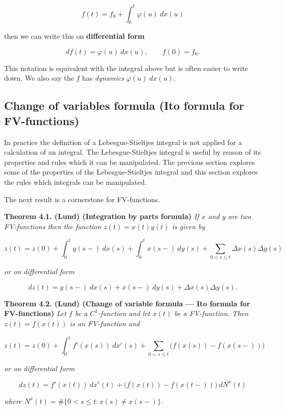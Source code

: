\documentclass[a4paper,12pt,openany]{book}
\begin{document}
\[
f(t)=f_0+\int_0^t\varphi(u)\ dx(u)
\]

then we can write this on \textbf{differential form}

\[
df(t)=\varphi(u)\ dx(u),\qquad f(0)=f_0.
\]

This notation is equivalent with the integral above but is often easier to write down. We also say the \(f\) has \emph{dynamics} \(\varphi(u)\ dx(u)\).

\hypertarget{change-of-variables-formula-ito-formula-for-fv-functions}{%
\subsection{Change of variables formula (Ito formula for FV-functions)}\label{change-of-variables-formula-ito-formula-for-fv-functions}}

In practice the definition of a Lebesgue-Stieltjes integral is not applied for a calculation of an integral. The Lebesgue-Stieltjes integral is useful by reason of its properties and rules which it can be manipulated. The previous section explores some of the properties of the Lebesgue-Stieltjes integral and this section explores the rules which integrals can be manipulated.

The next result is a cornerstone for FV-functions.

\textbf{Theorem 4.1. (Lund) (Integration by parts formula)} \emph{If \(x\) and \(y\) are two FV-functions then the function \(z(t)=x(t)y(t)\) is given by}

\[
z(t)=z(0)+\int_0^t y(s-)\ dx(s)+\int_0^t x(s-)\ dy(s)+\sum_{0<s\le t}\Delta x(s)\Delta y(s)
\]

\emph{or on differential form}

\[
dz(t)=y(s-)\ dx(s)+ x(s-)\ dy(s)+\Delta x(s)\Delta y(s).
\]

\textbf{Theorem 4.2. (Lund) (Change of variable formula --- Ito formula for FV-functions)} \emph{Let \(f\) be a \(C^1\)-function and let \(x(t)\) be a FV-function. Then \(z(t)=f(x(t))\) is an FV-function and}

\[
z(t)=z(0)+\int_0^tf'(x(s))\ dx^c(s)+\sum_{0<s\le t}\Big(f(x(s))-f(x(s-))\Big)
\]

\emph{or on differential form}

\[
dz(t)=f'(x(t))\ dx^c(t)+\Big(f(x(t))-f(x(t-))\Big)\ dN^x(t)
\]

\emph{where \(N^x(t)=\#\{0<s\le t: x(s)\ne x(s-)\}\).}
\end{document}
